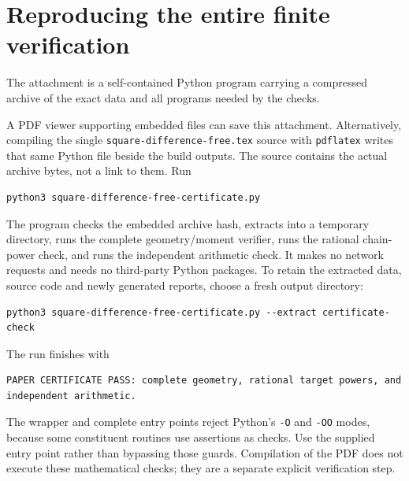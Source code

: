 \documentclass[11pt]{article}
\theoremstyle{definition}
\theoremstyle{remark}
\begin{document}
\section{Reproducing the entire finite verification}\label{app:reproduction}
The attachment is a self-contained Python program carrying a compressed
archive of the exact data and all programs needed by the checks.
\begin{center}
\end{center}
A PDF viewer supporting embedded files can save this attachment.
Alternatively, compiling the single \texttt{square-difference-free.tex}
source with \texttt{pdflatex} writes that same Python file beside the build
outputs. The source contains the actual archive bytes, not a link to them.
Run
\begin{lstlisting}
python3 square-difference-free-certificate.py
\end{lstlisting}
The program checks the embedded archive hash, extracts into a temporary
directory, runs the complete geometry/moment verifier, runs the rational
chain-power check, and runs the independent arithmetic check. It makes no
network requests and needs no third-party Python packages. To retain the
extracted data, source code and newly generated reports, choose a fresh
output directory:
\begin{lstlisting}
python3 square-difference-free-certificate.py --extract certificate-check
\end{lstlisting}
The run finishes with
\begin{lstlisting}
PAPER CERTIFICATE PASS: complete geometry, rational target powers, and independent arithmetic.
\end{lstlisting}
The wrapper and complete entry points reject Python's \texttt{-O} and
\texttt{-OO} modes, because some constituent routines use assertions as
checks. Use the supplied entry point rather than bypassing those guards.
Compilation of the PDF does not execute these mathematical checks; they
are a separate explicit verification step.
\end{document}
